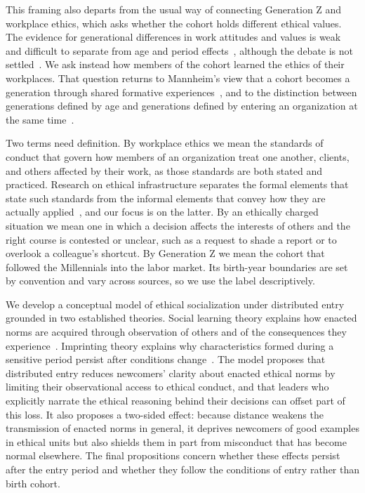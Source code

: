 This framing also departs from the usual way of connecting Generation Z and workplace ethics, which asks whether the cohort holds different ethical values. The evidence for generational differences in work attitudes and values is weak and difficult to separate from age and period effects~\citep{costanza2012generational,rudolph2021generations}, although the debate is not settled~\citep{campbell2015generational}. We ask instead how members of the cohort learned the ethics of their workplaces. That question returns to Mannheim's view that a cohort becomes a generation through shared formative experiences~\citep{mannheim1952problem}, and to the distinction between generations defined by age and generations defined by entering an organization at the same time~\citep{joshi2010unpacking}.

Two terms need definition. By workplace ethics we mean the standards of conduct that govern how members of an organization treat one another, clients, and others affected by their work, as those standards are both stated and practiced. Research on ethical infrastructure separates the formal elements that state such standards from the informal elements that convey how they are actually applied~\citep{tenbrunsel2003building}, and our focus is on the latter. By an ethically charged situation we mean one in which a decision affects the interests of others and the right course is contested or unclear, such as a request to shade a report or to overlook a colleague's shortcut. By Generation Z we mean the cohort that followed the Millennials into the labor market. Its birth-year boundaries are set by convention and vary across sources, so we use the label descriptively.

We develop a conceptual model of ethical socialization under distributed entry grounded in two established theories. Social learning theory explains how enacted norms are acquired through observation of others and of the consequences they experience~\citep{bandura1977social}. Imprinting theory explains why characteristics formed during a sensitive period persist after conditions change~\citep{marquis2013imprinting}. The model proposes that distributed entry reduces newcomers' clarity about enacted ethical norms by limiting their observational access to ethical conduct, and that leaders who explicitly narrate the ethical reasoning behind their decisions can offset part of this loss. It also proposes a two-sided effect: because distance weakens the transmission of enacted norms in general, it deprives newcomers of good examples in ethical units but also shields them in part from misconduct that has become normal elsewhere. The final propositions concern whether these effects persist after the entry period and whether they follow the conditions of entry rather than birth cohort.

